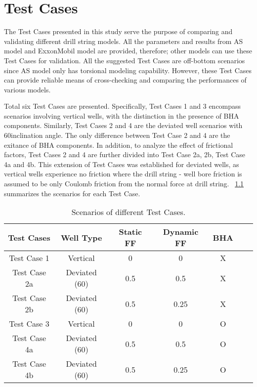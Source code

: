 \chapter{Test Cases}
\label{ch:testcases}
The Test Cases presented in this study serve the purpose of comparing and validating different drill string models. All the parameters and results from AS model and ExxonMobil model are provided, therefore; other models can use these Test Cases for validation. All the suggested Test Cases are off-bottom scenarios since AS model only has torsional modeling capability. However, these Test Cases can provide reliable means of cross-checking and comparing the performances of various models. 

Total six Test Cases are presented. Specifically, Test Cases 1 and 3 encompass scenarios involving vertical wells, with the distinction in the presence of BHA components. Similarly, Test Cases 2 and 4 are the deviated well scenarios with 60\textdegree inclination angle. The only difference between Test Case 2 and 4 are the exitance of BHA components. In addition, to analyze the effect of frictional factors, Test Cases 2 and 4 are further divided into Test Case 2a, 2b, Test Case 4a and 4b. This extension of Test Cases was established for deviated wells, as vertical wells experience no friction where the drill string - well bore friction is assumed to be only Coulomb friction from the normal force at drill string. \tablename~\ref{Test_case_summary} summarizes the scenarios for each Test Case. 
\begin{table}[!hbt]
    \centering
    \begin{tabular}{|c|c|c|c|c|c|c|}
        \hline
        \textbf{Test Cases} & \textbf{Well Type} & \textbf{Static FF} & \textbf{Dynamic FF}& \textbf{BHA}\\
        \hline
        Test Case 1 & Vertical & 0 & 0 & X\\
        \hline
        Test Case 2a & Deviated (60\textdegree{}) & 0.5 & 0.5 & X \\
        \hline
        Test Case 2b & Deviated (60\textdegree{}) & 0.5 & 0.25 & X \\
        \hline
        Test Case 3 & Vertical & 0 & 0 & O\\                                                
        \hline
        Test Case 4a & Deviated (60\textdegree{}) & 0.5 & 0.5 & O \\                                                  
        \hline
        Test Case 4b & Deviated (60\textdegree{}) & 0.5 & 0.25 & O \\                                                     
        \hline
    \end{tabular}
    \caption[Scenarios of different Test Cases]{Scenarios of different Test Cases.}
    \label{Test_case_summary}
\end{table} 
